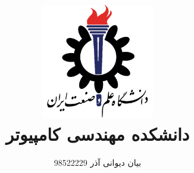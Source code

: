 \title{
    \center
    \includegraphics[width=5cm, height=5cm]{images/IUST_logo_color.png} \\
    دانشکده مهندسی کامپیوتر \\[25pt]     
\CourseName
}

\author{
    بیان دیوانی آذر  98522229 
  \\[25pt]
}
\date{\Semester}